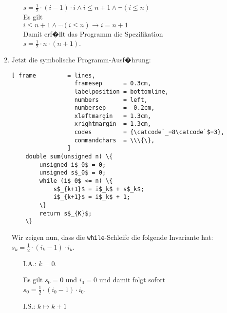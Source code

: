 \documentclass{article}
\renewcommand{\labelenumii}{\arabic{enumii}.}
\begin{document}
\begin{enumerate}
\begin{enumerate}
      \\[0.2cm]
      \hspace*{1.3cm}
      $s = \frac{1}{2} \cdot (i-1) \cdot i \wedge i \leq n + 1 \wedge \neg (i \leq n)$
      \\[0.2cm]
      Es gilt 
      \\
      \hspace*{1.3cm}
      $i \leq n + 1 \wedge \neg (i \leq n) \rightarrow i = n + 1$
      \\[0.2cm]
      Damit erf�llt das Programm die Spezifikation
      \\[0.2cm]
      \hspace*{1.3cm}
      $s = \frac{1}{2} \cdot n \cdot (n+1)$.
\end{enumerate}
\item Jetzt die symbolische Programm-Ausf�hrung:
      \begin{Verbatim}[ frame         = lines, 
                  framesep      = 0.3cm, 
                  labelposition = bottomline,
                  numbers       = left,
                  numbersep     = -0.2cm,
                  xleftmargin   = 1.3cm,
                  xrightmargin  = 1.3cm,
                  codes         = {\catcode`_=8\catcode`$=3},
                  commandchars  = \\\{\},
                ]
    double sum(unsigned n) \{
        unsigned i$_0$ = 0;
        unsigned s$_0$ = 0;
        while (i$_0$ <= n) \{
            s$_{k+1}$ = i$_k$ + s$_k$;
            i$_{k+1}$ = i$_k$ + 1;
        \}
        return s$_{K}$;
    \}
    \end{Verbatim} 
      Wir zeigen nun, dass die \texttt{while}-Schleife die folgende Invariante hat: 
      \\[0.2cm]
      \hspace*{1.3cm}
      $s_k = \frac{1}{2} \cdot (i_{k}-1) \cdot i_k$.
      \renewcommand{\labelenumii}{\arabic{enumii}.}
      \begin{enumerate}
      \item[I.A.:] $k=0$.

            Es gilt $s_0 = 0$ und $i_0 = 0$ und damit folgt sofort
            \\[0.2cm]
            \hspace*{1.3cm} $s_0 = \frac{1}{2} \cdot (i_{0}-1) \cdot i_0$.
      \item[I.S.:] $k \mapsto k+1$ 


\end{enumerate}
\end{enumerate}
\end{document}
